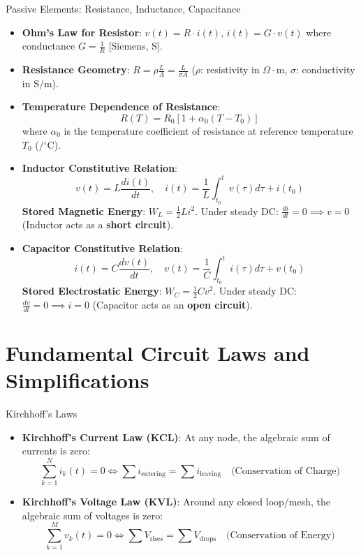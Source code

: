 \begin{formulabox}{Passive Elements: Resistance, Inductance, Capacitance}
\begin{itemize}[leftmargin=1.5em]
    \item \textbf{Ohm's Law for Resistor}: $v(t) = R \cdot i(t)$, \quad $i(t) = G \cdot v(t)$ where conductance $G = \frac{1}{R}$ [Siemens, S].
    \item \textbf{Resistance Geometry}: $R = \rho \frac{L}{A} = \frac{L}{\sigma A}$ ($\rho$: resistivity in $\Omega\cdot\text{m}$, $\sigma$: conductivity in $\text{S/m}$).
    \item \textbf{Temperature Dependence of Resistance}:
    \[ R(T) = R_0 \left[ 1 + \alpha_0 (T - T_0) \right] \]
    where $\alpha_0$ is the temperature coefficient of resistance at reference temperature $T_0$ ($/\!^\circ\text{C}$).
    \item \textbf{Inductor Constitutive Relation}:
    \[ v(t) = L \frac{di(t)}{dt}, \quad i(t) = \frac{1}{L}\int_{t_0}^t v(\tau)d\tau + i(t_0) \]
    \textbf{Stored Magnetic Energy}: $W_L = \frac{1}{2} L i^2$. \quad Under steady DC: $\frac{di}{dt} = 0 \implies v = 0$ (Inductor acts as a \textbf{short circuit}).
    \item \textbf{Capacitor Constitutive Relation}:
    \[ i(t) = C \frac{dv(t)}{dt}, \quad v(t) = \frac{1}{C}\int_{t_0}^t i(\tau)d\tau + v(t_0) \]
    \textbf{Stored Electrostatic Energy}: $W_C = \frac{1}{2} C v^2$. \quad Under steady DC: $\frac{dv}{dt} = 0 \implies i = 0$ (Capacitor acts as an \textbf{open circuit}).
\end{itemize}
\end{formulabox}

\section{Fundamental Circuit Laws and Simplifications}

\begin{formulabox}{Kirchhoff's Laws}
\begin{itemize}[leftmargin=1.5em]
    \item \textbf{Kirchhoff's Current Law (KCL)}: At any node, the algebraic sum of currents is zero:
    \[ \sum_{k=1}^N i_k(t) = 0 \iff \sum i_{\text{entering}} = \sum i_{\text{leaving}} \quad \text{(Conservation of Charge)} \]
    \item \textbf{Kirchhoff's Voltage Law (KVL)}: Around any closed loop/mesh, the algebraic sum of voltages is zero:
    \[ \sum_{k=1}^M v_k(t) = 0 \iff \sum V_{\text{rises}} = \sum V_{\text{drops}} \quad \text{(Conservation of Energy)} \]
\end{itemize}
\end{formulabox}

